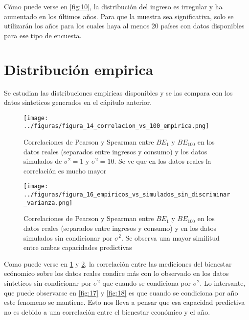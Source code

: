 Cómo puede verse en \ref{fig:10}, la distribución del ingreso es irregular y ha aumentado en los últimos años. Para que la muestra sea significativa, solo se utilizarán los años para los cuales haya al menos 20 países con datos disponibles para ese tipo de encuesta.

\section{Distribución empirica}

Se estudian las distribuciones empiricas disponibles y se las compara con los datos sinteticos generados en el cápitulo anterior.

\begin{figure}[H] %
    \centering %
    \texttt{[image: ../figuras/figura\_14\_correlacion\_vs\_100\_empirica.png]} %
    \caption{Correlaciones de Pearson y Spearman entre $BE_1$ y $BE_{100}$ en los datos reales (separados entre ingresos y consumo) y los datos simulados de $\sigma^2=1$ y $\sigma^2=10$. Se ve que en los datos reales la correlación es mucho mayor}
    \label{fig:14} %
\end{figure}

\begin{figure}[H] %
    \centering %
    \texttt{[image: ../figuras/figura\_16\_empiricos\_vs\_simulados\_sin\_discriminar\_varianza.png]} %
    \caption{Correlaciones de Pearson y Spearman entre $BE_1$ y $BE_{100}$ en los datos reales (separados entre ingresos y consumo) y en los datos simulados sin condicionar por $\sigma^2$. Se observa una mayor similitud entre ambas capacidades predictivas}
    \label{fig:16} %
\end{figure}

Como puede verse en \ref{fig:14} y \ref{fig:16}, la correlación entre las mediciones del bienestar ecónomico sobre los datos reales condice más con lo observado en los datos sinteticos sin condicionar por $\sigma^2$ que cuando se condiciona por $\sigma^2$. Lo intersante, que puede observarse en \ref{fig:17} y \ref{fig:18} es que cuando se condiciona por año este fenomeno se mantiene. Esto nos lleva a pensar que esa capacidad predictiva no es debido a una correlación entre el bienestar económico y el año.

